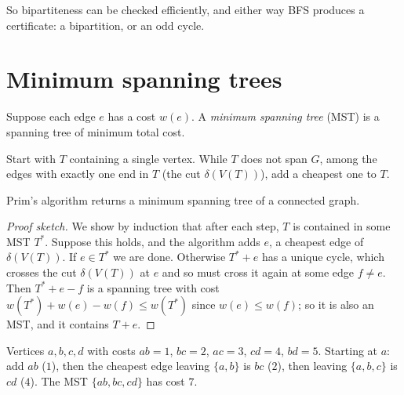 So bipartiteness can be checked efficiently, and either way BFS produces a certificate: a
bipartition, or an odd cycle.

\section{Minimum spanning trees}

Suppose each edge $e$ has a cost $w(e)$. A \emph{minimum spanning tree} (MST) is a spanning tree
of minimum total cost.

\begin{important}
Start with $T$ containing a single vertex. While $T$ does not span $G$, among the edges with
exactly one end in $T$ (the cut $\delta(V(T))$), add a cheapest one to $T$.
\end{important}

\begin{theorem}
Prim's algorithm returns a minimum spanning tree of a connected graph.
\end{theorem}
\begin{proof}[Proof sketch]
We show by induction that after each step, $T$ is contained in some MST $T^*$. Suppose this holds,
and the algorithm adds $e$, a cheapest edge of $\delta(V(T))$. If $e\in T^*$ we are done.
Otherwise $T^* + e$ has a unique cycle, which crosses the cut $\delta(V(T))$ at $e$ and so must
cross it again at some edge $f \neq e$. Then $T^* + e - f$ is a spanning tree with cost
$w(T^*) + w(e) - w(f) \le w(T^*)$ since $w(e)\le w(f)$; so it is also an MST, and it contains
$T + e$.
\end{proof}

\begin{example}
Vertices $a,b,c,d$ with costs $ab = 1$, $bc = 2$, $ac = 3$, $cd = 4$, $bd = 5$. Starting at $a$:
add $ab$ ($1$), then the cheapest edge leaving $\{a,b\}$ is $bc$ ($2$), then leaving $\{a,b,c\}$ is
$cd$ ($4$). The MST $\{ab,bc,cd\}$ has cost $7$.
\end{example}

\begin{center}
\end{center}

